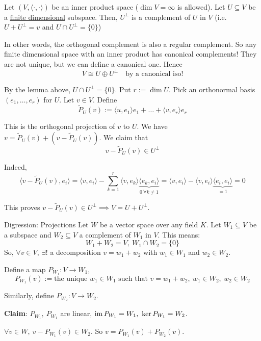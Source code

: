 \documentclass[12pt]{article}
\begin{document}
\begin{theorem}{}{}
    Let $(V, \langle \cdot, \cdot \rangle)$ be an inner product space ($\dim V = \infty$ is allowed). Let $U \subseteq V$ be a \underline{finite dimensional} subspace. Then, $U^\perp$ is a complement of $U$ in $V$ (i.e. $U + U^\perp = v$ and $U \cap U^\perp = \{0\}$)
\end{theorem}

In other words, the orthogonal complement is also a regular complement. So any finite dimensional space with an inner product has canonical complements! They are not unique, but we can define a canonical one. Hence
$$
    V \cong U \oplus U^\perp \quad \text{by a canonical iso!}
$$

\begin{proofbox}
    By the lemma above, $U \cap U^\perp = \{0\}$. Put $r := \dim U$. Pick an orthonormal basis $(e_1,\dots,e_r)$ for $U$. Let $v \in V$. Define
    $$
        \tilde{P}_U(v) := \langle u, e_1 \rangle e_1 + \dots + \langle v, e_r \rangle e_r
    $$  

    This is the orthogonal projection of $v$ to $U$. We have $v = \tilde{P}_U(v) + (v - \tilde{P}_U(v))$. We claim that
    $$
        v - \tilde{P}_U(v) \in U^\perp
    $$

    Indeed,
    $$
        \langle v - \tilde{P}_U(v), e_i \rangle = \langle v, e_i \rangle - \sum_{k = 1}^{r} \langle v, e_k \rangle \underbrace{\langle e_k, e_i \rangle}_{0\ \forall k \neq 1} = \langle v, e_i \rangle - \langle v, e_i \rangle \underbrace{\langle e_i, e_i \rangle}_{= 1} = 0
    $$

    This proves $v - \tilde{P}_U(v) \in U^\perp \implies V = U + U^\perp$.
\end{proofbox}

\begin{notebox}{Digression: Projections}{}
    Let $W$ be a vector space over any field $K$. Let $W_1 \subseteq V$ be a subspace and $W_2 \subseteq V$ a complement of $W_1$ in $V$. This means:
    $$
        W_1 + W_2 = V,\ W_1 \cap W_2 = \{0\}
    $$
    So, $\forall v \in V,\ \exists! $ a decomposition $v = w_1 + w_2$ with $w_1 \in W_1$ and $w_2 \in W_2$.

    Define a map $P_{W_1}: V \rightarrow W_1$,
    $$
        P_{W_1}(v) := \text{the unique } w_1 \in  W_1 \text{ such that } v = w_1 + w_2,\ w_1 \in W_2,\ w_2 \in W_2
    $$

    Similarly, define $P_{W_2}: V \rightarrow W_2$.

    \textbf{Claim}: $P_{W_1},\ P_{W_1}$ are linear, $\operatorname{im} P_{W_1} = W_1,\ \ker P_{W_1} = W_2$. 
    
    $\forall v \in W,\ v - P_{W_1}(v) \in W_2$. So $v = P_{W_1}(v) + P_{W_2}(v)$.
\end{notebox}
\end{document}
